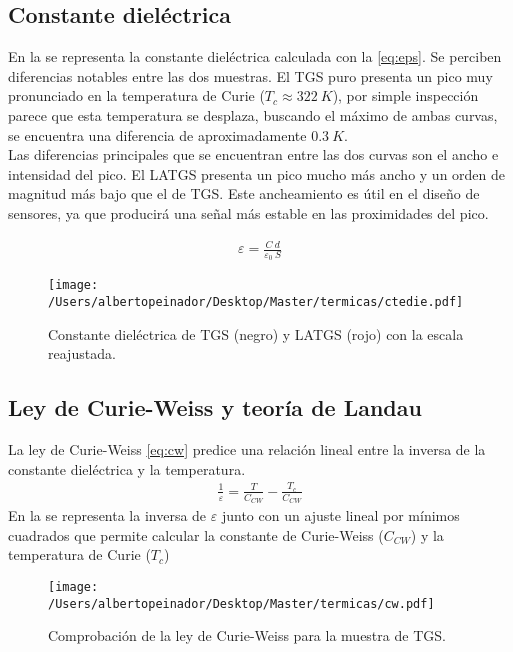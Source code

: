 \documentclass[a4paper, 12pt, spanish]{article}
\begin{document}
\begin{multicols}{2}
\subsection*{Constante dieléctrica}
En la  se representa la constante dieléctrica calculada con la \cref{eq:eps}. Se perciben diferencias notables entre las dos muestras. El TGS puro presenta un pico muy pronunciado en la temperatura de Curie ($T_c\approx 322\ K$), por simple inspección parece que esta temperatura se desplaza, buscando el máximo de ambas curvas, se encuentra una diferencia de aproximadamente $0.3\ K$.\\
Las diferencias principales que se encuentran entre las dos curvas son el ancho e intensidad del pico. El LATGS presenta un pico mucho más ancho y un orden de magnitud más bajo que el de TGS. Este ancheamiento es útil en el diseño de sensores, ya que producirá una señal más estable en las proximidades del pico.

\begin{eqnarray}
    \varepsilon = \frac{C\ d}{\varepsilon_0\ S} \label{eq:eps}
\end{eqnarray}
\begin{figure}[H]
    \centering
    \texttt{[image: /Users/albertopeinador/Desktop/Master/termicas/ctedie.pdf]}
    \caption{Constante dieléctrica de TGS (negro) y LATGS (rojo) con la escala reajustada.}\label{fig:eps}
\end{figure}
\subsection*{Ley de Curie-Weiss y teoría de Landau}
La ley de Curie-Weiss \cref{eq:cw} predice una relación lineal entre la inversa de la constante dieléctrica y la temperatura.
\begin{eqnarray}
    \frac{1}{\varepsilon} = \frac{T}{C_{CW}}-\frac{T_c}{C_{CW}}\label{eq:cw}
\end{eqnarray}
En la  se representa la inversa de $\varepsilon$ junto con un ajuste lineal por mínimos cuadrados que permite calcular la constante de Curie-Weiss ($C_{CW}$) y la temperatura de Curie ($T_c$)
\begin{figure}[H]
    \centering
    \texttt{[image: /Users/albertopeinador/Desktop/Master/termicas/cw.pdf]}
    \caption{Comprobación de la ley de Curie-Weiss para la muestra de TGS.}\label{fig:cw}
\end{figure}


\end{multicols}
\end{document}
